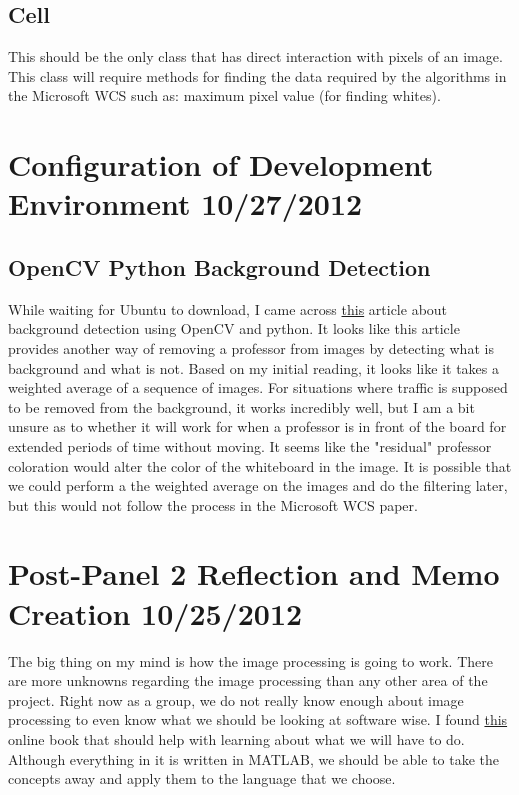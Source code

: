 \documentclass[]{article}
\begin{document}
		\subsection{Cell}
			This should be the only class that has direct interaction with pixels of an image. This class will require methods for finding the data required by the algorithms in the Microsoft WCS such as: maximum pixel value (for finding whites).
		 
	
	
	\section{Configuration of Development Environment 10/27/2012}
	
		\subsection{OpenCV Python Background Detection}
			While waiting for Ubuntu to download, I came across \href{http://opencvpython.blogspot.com/}{this} article about background detection using OpenCV and python. It looks like this article provides another way of removing a professor from images by detecting what is background and what is not. Based on my initial reading, it looks like it takes a weighted average of a sequence of images. For situations where traffic is supposed to be removed from the background, it works incredibly well, but I am a bit unsure as to whether it will work for when a professor is in front of the board for extended periods of time without moving. It seems like the "residual" professor coloration would alter the color of the whiteboard in the image. It is possible that we could perform a the weighted average on the images and do the filtering later, but this would not follow the process in the Microsoft WCS paper. 
	
	
	
	\section{Post-Panel 2 Reflection and Memo Creation 10/25/2012}
		The big thing on my mind is how the image processing is going to work. There are more unknowns regarding the image processing than any other area of the project. Right now as a group, we do not really know enough about image processing to even know what we should be looking at software wise. I found \href{http://en.wikibooks.org/wiki/MATLAB_Programming/Image_Processing_Toolbox}{this} online book that should help with learning about what we will have to do. Although everything in it is written in MATLAB, we should be able to take the concepts away and apply them to the language that we choose. 
		
\end{document}

